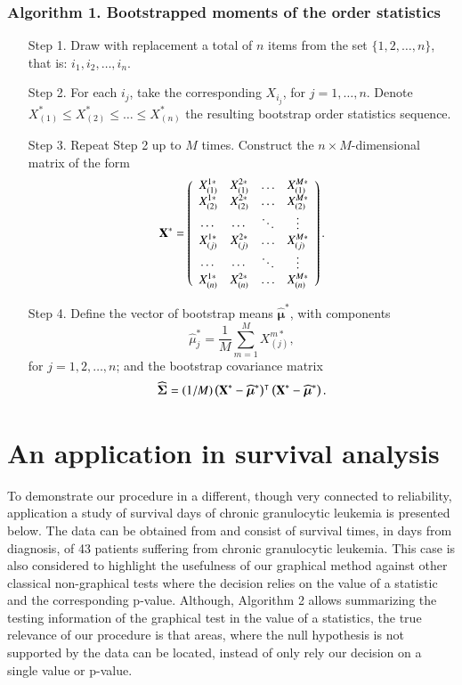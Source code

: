 \documentclass[preprint,12pt]{elsarticle}
\begin{document}
\subsubsection*{Algorithm 1. Bootstrapped moments of the order statistics}
\begin{enumerate}
\item[Step 1.] Draw with replacement a total of $n$ items from the set $\{1,2, \ldots, n\}$, that is: $i_1,i_2, \ldots, i_n$.
\item[Step 2.] For each $i_j$, take the corresponding $X_{i_j}$, for $j=1,\ldots, n$. Denote $X^*_{(1)} \leq X^*_{(2)}\leq  \ldots \leq X^*_{(n)}$ the resulting bootstrap order statistics sequence.  
\item[Step 3.] Repeat Step 2 up to $M$ times. Construct the $n \times M$-dimensional matrix of the form
$${\bf X}^*=\left(\begin{array} {cccc}
                     X^{1*}_{(1)} & X^{2*}_{(1)}&  \ldots & X^{M*}_{(1)} \\
                     X^{1*}_{(2)} & X^{2*}_{(2)}&  \ldots & X^{M*}_{(2)} \\
										 \cdots    & \cdots   &  \ddots  & \vdots    \\
										 X^{1*}_{(j)} & X^{2*}_{(j)}&  \ldots & X^{M*}_{(j)} \\
										 \cdots    & \cdots   &  \ddots  & \vdots    \\
										 X^{1*}_{(n)} & X^{2*}_{(n)}&  \ldots & X^{M*}_{(n)} \\
              \end{array}\right).$$
\item[Step 4.] Define the vector of bootstrap means $\widehat{\boldsymbol \mu}^*$, with components 
$$\widehat{ \mu}_j^*=\frac{1}{M}\sum_{m=1}^M X_{(j)}^{m*},$$
 for $j=1,2, \ldots, n$; and the bootstrap covariance matrix  
$$\widehat{\boldsymbol \Sigma}=(1/M)\left({\bf X}^*-\widehat{\boldsymbol \mu}^*\right)^{\intercal}\left({\bf X}^*-\widehat{\boldsymbol \mu}^*\right).$$
\end{enumerate}
\section{An application in survival analysis}
To demonstrate our procedure in a different, though very connected to reliability,  application a study of survival days  of chronic granulocytic leukemia is presented below. The data can be obtained from \cite{LX06} and consist of survival times, in days from diagnosis, of 43 patients suffering from chronic granulocytic leukemia.
This case is also considered to highlight the usefulness of our graphical method against other classical non-graphical tests where the decision relies on the value of a statistic and the corresponding p-value. Although, Algorithm 2 allows summarizing  the testing information of the graphical test in the value of a statistics, the true relevance of our procedure is that areas, where the null hypothesis is not supported by the data can be located, instead of only rely our decision on a single value or p-value. 
\end{document}
